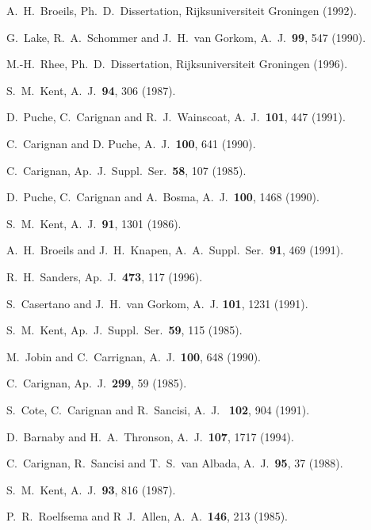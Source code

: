 \documentclass[preprint,aps]{revtex4}
\begin{document}
\begin{thebibliography}{}
 A.~H.~Broeils,  Ph.~D.~Dissertation, Rijksuniversiteit Groningen (1992).

 G.~Lake, R.~A.~Schommer and J.~H.~van Gorkom, A.~J.~{\bf 99}, 547 (1990).

 M.-H.~Rhee, Ph.~D.~Dissertation, Rijksuniversiteit Groningen (1996).

 S.~M.~Kent, A.~J.~{\bf 94}, 306 (1987).


 D.~Puche, C.~Carignan and R.~J.~Wainscoat,  A.~J.~{\bf 101},
447 (1991).

 C.~Carignan and D. Puche, A.~J.~{\bf 100}, 641 (1990).

 C.~Carignan, Ap.~J.~Suppl.~Ser.~{\bf  58}, 107 (1985).


 D.~Puche, C.~Carignan and A.~Bosma,  A.~J.~{\bf 100}, 1468 (1990).

 S.~M.~Kent, A.~J.~{\bf 91}, 1301 (1986).

 A.~H.~Broeils and J.~H.~Knapen, A.~A.~Suppl.~Ser.~{\bf  91}, 469 (1991).

 R.~H.~Sanders, Ap.~J.~{\bf 473}, 117 (1996).




 S.~Casertano and J.~H.~van Gorkom,  A.~J. {\bf 101}, 1231 (1991).


 S.~M.~Kent, Ap.~J.~Suppl.~Ser.~{\bf 59}, 115 (1985).

 M.~Jobin and C.~Carrignan, A.~J.~{\bf 100}, 648 (1990).

 C.~Carignan, Ap.~J.~{\bf  299}, 59 (1985).





 S.~Cote, C.~Carignan and R.~Sancisi, A.~J.~ {\bf 102}, 904 (1991).



 D.~Barnaby and H.~A.~Thronson, A.~J.~{\bf 107}, 1717 (1994).

 C.~Carignan, R.~Sancisi and  T.~S.~van Albada, A.~J.~{\bf 95}, 37 (1988).

 S.~M.~Kent, A.~J.~{\bf 93}, 816 (1987).

 P.~R.~Roelfsema and R~J.~Allen, A.~A.~{\bf 146}, 213 (1985).


\end{thebibliography}
\end{document}
